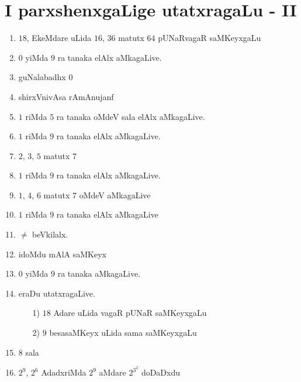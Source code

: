 \chapter{I parxshenxgaLige utatxragaLu - {\rm II}}

\begin{enumerate}
 \renewcommand{\labelenumi}{\rm(\theenumi)}
\item $18$, EkeMdare uLida $16$, $36$ matutx $64$ pUNaRvagaR saMKeyxgaLu 

\item $0$ yiMda $9$ ra tanaka elAlx aMkagaLive.

\item guNalabadhx $0$

\item shirxVnivAsa rAmAnujanf

\item $1$ riMda $5$ ra tanaka oMdeV sala elAlx aMkagaLive.

\item $1$ riMda $9$ ra tanaka elAlx aMkagaLive.

\item $2$, $3$, $5$ matutx $7$

\item $1$ riMda $9$ ra tanaka elAlx aMkagaLive.

\item $1$, $4$, $6$ matutx $7$ oMdeV aMkagaLive

\item $1$ riMda $9$ ra tanaka elAlx aMkagaLive

\item $\neq$ beVkilalx.

 \item idoMdu mAlA saMKeyx

\item $0$ yiMda $9$ ra tanaka aMkagaLive.

\item eraDu utatxragaLive.
  \begin{itemize}
  \item[{\rm 1)}] $18$ Adare uLida vagaR pUNaR saMKeyxgaLu

  \item[{\rm 2)}] $9$ besasaMKeyx uLida sama saMKeyxgaLu
      \end{itemize}

\item $8$ sala 

\item $2^9$, $2^6$ AdadxriMda $2^9$ aMdare $2^{3^2}$ doDaDxdu


\end{enumerate}
